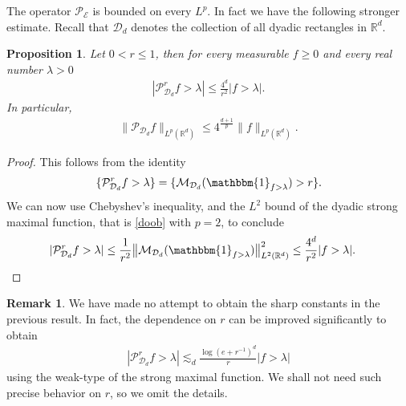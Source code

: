 \documentclass[oneside]{amsart}
\newtheorem{proposition}[theorem]{Proposition}
\theoremstyle{definition}
\newtheorem*{remark*}{Remark}
\theoremstyle{plain}
\numberwithin{equation}{section}
\numberwithin{theorem}{section}
\newcommand{\ind}{\mathbbm{1}}
\begin{document}
The operator $\mathcal{P}_{\mathcal{E}}$ is bounded on every $L^p$.
In fact we have the following stronger estimate.
Recall that $\mathcal{D}_d$ denotes the collection of all dyadic rectangles in
$\mathbb{R}^d$.
\begin{proposition} \label{smm}
  Let $0 < r \leq 1$, then for every measurable $f \geq 0$ and every real number
  $\lambda > 0$
  \begin{align*}
    |\mathcal{P}^r_{\mathcal{D}_d} f > \lambda| \leq \frac{4^d}{r^2}
    |f > \lambda|.
  \end{align*}
  In particular,
  \begin{align*}
    \|\mathcal{P}_{\mathcal{D}_d} f \|_{L^p(\mathbb{R}^d)} \leq
    4^{\frac{d+1}{p}}\|f\|_{L^p(\mathbb{R}^d)}.
  \end{align*}
\end{proposition}
\begin{proof}
  This follows from the identity
  \begin{align*}
    \{\mathcal{P}^r_{\mathcal{D}_d}f > \lambda\} =
    \{\mathcal{M}_{\mathcal{D}_d}(\ind_{f> \lambda}) > r \}.
  \end{align*}
  We can now use Chebyshev's inequality, and the $L^2$ bound of the
  dyadic strong maximal function, that is \eqref{doob} with $p=2$, to
  conclude
  \begin{align*}
    |\mathcal{P}^r_{\mathcal{D}_d}f > \lambda|
    &\leq \frac{1}{r^2} \big\| \mathcal{M}_{\mathcal{D}_d}(\ind_{f >
      \lambda}) \big\|_{L^2(\mathbb{R}^d)}^2
    \leq \frac{4^d}{r^2} |f > \lambda|.
  \end{align*}
\end{proof}

\begin{remark*}
  We have made no attempt to obtain the sharp constants in the previous result.
  In fact, the dependence on $r$ can be improved significantly to obtain
  \begin{align*}
    |\mathcal{P}_{\mathcal{D}_d}^r f > \lambda| \lesssim_d
     \frac{\log(e + r^{-1})^d}{r} |f > \lambda|
  \end{align*}
  using the weak-type of the strong maximal function.
  We shall not need such precise behavior on $r$, so we omit the details.
\end{remark*}
\end{document}
